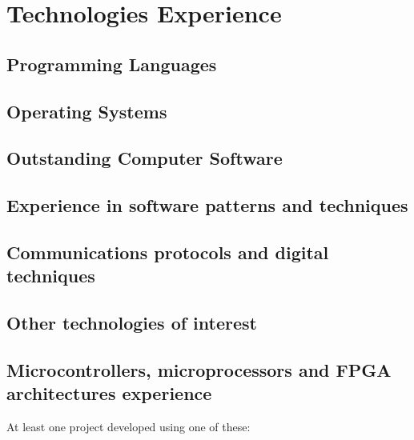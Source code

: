
\section{Technologies Experience}
   \subsection{Programming Languages}
   \cvitem { \dicadvanced }{\proglangadvanced }
   \cvitem { \dicmedium   }{\proglangmedium }  
   \cvitem { \dicbasic    }{\proglangbasic}    

   \subsection{Operating Systems}
      \cvitem { \dicadvanced } { \osadvanced }
      \cvitem { \dicmedium   } { \osmedium   }
      \cvitem { \dicbasic    } { \osbasic    }
   \subsection{Outstanding Computer Software}
      \cvitem { \dicadvanced } { \computerprogadvanced }
      \cvitem { \dicmedium   } { \computerprogmedium   }
      \cvitem { \dicbasic    } { \computerprogbasic    }

   \subsection{Experience in software patterns and techniques}
      \cvitem { \dicadvanced } { \softtechadvanced }

   \subsection{Communications protocols and digital techniques}
      \cvitem{\dicadvanced }{ \protocoladvanced }
      \cvitem{\dicmedium   }{ \protocolmedium   }
      \cvitem{\dicbasic    }{ \protocolbasic    }

   \subsection{Other technologies of interest}
      \cvitem{\dicadvanced} { \othertechadvanced }
      \cvitem{\dicmedium  } { \othertechmedium   }


   \subsection{Microcontrollers, microprocessors and FPGA architectures experience}
      \cvitem {} { At least one project developed using one of these:}

